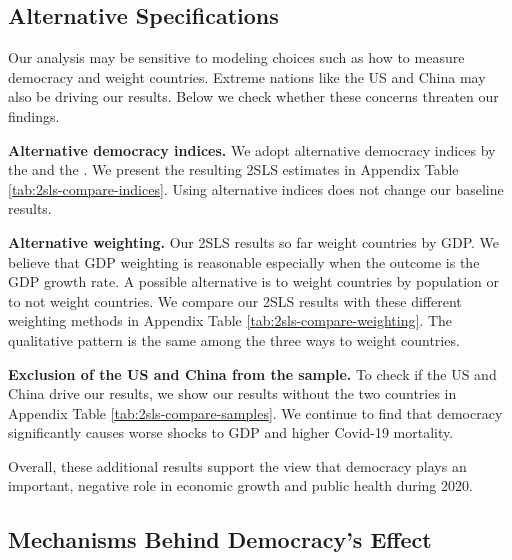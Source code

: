 
\subsection{Alternative Specifications}
Our analysis may be sensitive to modeling choices such as how to measure democracy and weight countries. Extreme nations like the US and China may also be driving our results. Below we check whether these concerns threaten our findings. 

\textbf{Alternative democracy indices.} 
We adopt alternative democracy indices by the  \citet{centerforsystemicpeacePolity5AnnualTime2018} and the \citet{DemocracyIndex2020}. We present the resulting 2SLS estimates in Appendix Table \ref{tab:2sls-compare-indices}. Using alternative indices does not change our baseline results.

\textbf{Alternative weighting.} Our 2SLS results so far weight countries by GDP. We believe that GDP weighting is reasonable especially when the outcome is the GDP growth rate. 
A possible alternative is to weight countries by population or to not weight countries. We compare our 2SLS results with these different weighting methods in Appendix Table \ref{tab:2sls-compare-weighting}. The qualitative pattern is the same among the three ways to weight countries. 

\textbf{Exclusion of the US and China from the sample.} To check if the US and China drive our results, we show our results without the two countries in Appendix Table \ref{tab:2sls-compare-samples}. We continue to find that democracy significantly causes worse shocks to GDP and higher Covid-19 mortality. %

Overall, these additional results support the view that democracy plays an important, negative role in economic growth and public health during 2020. 

\subsection{Mechanisms Behind Democracy's Effect}

